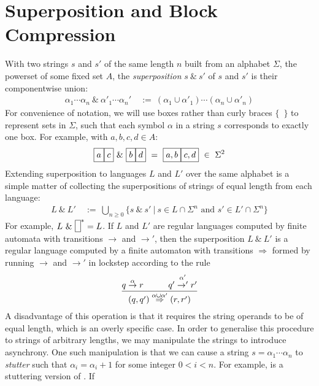 \documentclass[a4paper,11pt]{article}
\makeatletter
\newcommand{\vph}[1]{\vphantom{#1}}
\newcommand{\sta}[2]{\stackrel{#1}{#2}}
\newcommand{\ebox}[1]{\fbox{$\vph{',}#1$}}
\newcommand{\eboxl}[1]{\fbox{$\vph{'}#1$}}
\newcommand{\eboxb}[1]{\fbox{$\vph{@}#1$}}
\makeatother
\begin{document}
\section{Superposition and Block Compression}\label{sp and bc}
With two strings $s$ and $s'$ of the same length $n$
built from an alphabet $\Sigma$, the powerset of some fixed set 
$A$,
the \textit{superposition} $s ~\&~ s'$ of $s$ and $s'$ is their componentwise 
union:
\begin{align*}
\alpha_1\cdots\alpha_n \ \&\ 
\alpha'_1\cdots\alpha_n' & \ :=\
(\alpha_1\cup\alpha'_1)\cdots(\alpha_n\cup\alpha'_n)
\end{align*}
For convenience of notation, we will use boxes rather than curly braces 
$\{$~$\}$ to represent sets in $\Sigma$, such that each symbol $\alpha$ in a 
string $s$ corresponds to exactly one box. For example, with $a, b, c, d \in 
A$:
\begin{align*}
\ebox{a}\ebox{c} \ \& \ \ebox{b}\ebox{d} \ = \
\ebox{a, b}\ebox{c, d} \ \in\ \Sigma^2
\end{align*}
Extending superposition to languages $L$ and $L'$ over the same alphabet is a 
simple matter of 
collecting the superpositions of strings of equal length from each language: 
\begin{align*}
L ~\&~ L' & \ :=\ \bigcup_{n\geq 0}
\{s~\&~s'\ | \ s\in L\cap \Sigma^n\mbox{ and }s'\in L'\cap \Sigma^n\}
\end{align*}
For example, $L ~\&~ \eboxb{}^\ast = L$.
If $L$ and $L'$ are regular languages computed by finite automata
with transitions $\to$ and $\to'$, then the superposition $L~\&~ L'$ is
a regular language computed by a finite automaton with transitions
$\Rightarrow$
formed by running $\to$ and $\to'$ in lockstep
according to the rule 
\begin{align*}
\frac{q \sta{\alpha}{\to} r   \hspace{.4in} q' \sta{\alpha'}{\to'} r'}{
	(q,q') \sta{\alpha\cup\alpha'}{\Rightarrow} (r,r')}
\end{align*}
A disadvantage of this operation is that it requires the string operands to be 
of equal length, which is an overly specific case. In order to generalise this 
procedure to strings of arbitrary lengths, we may 
manipulate the strings to introduce asynchrony. One such manipulation is that 
we can cause a string $s=\alpha_1\cdots\alpha_n$ to \textit{stutter} such that 
$\alpha_i=\alpha_i+1$ for some integer $0 < i < n$. For example, 
\eboxl{a}\eboxl{a}\eboxl{a}\eboxl{c}\eboxl{c}
 is a stuttering version of 
\eboxl{a}\eboxl{c}. If 
\end{document}
